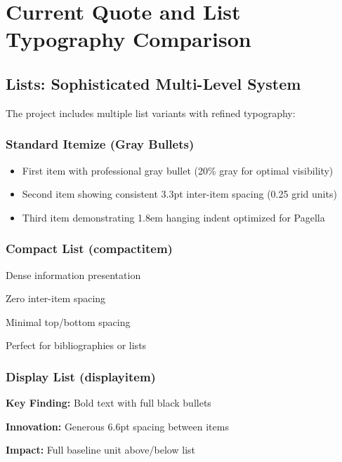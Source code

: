 \documentclass[11pt]{article}
\begin{document}
\section{Current Quote and List Typography Comparison}

\subsection{Lists: Sophisticated Multi-Level System}

The project includes multiple list variants with refined typography:

\subsubsection{Standard Itemize (Gray Bullets)}
\begin{itemize}
\item First item with professional gray bullet (20\% gray for optimal visibility)
\item Second item showing consistent 3.3pt inter-item spacing (0.25 grid units)
\item Third item demonstrating 1.8em hanging indent optimized for Pagella
\end{itemize}

\subsubsection{Compact List (compactitem)}
\begin{compactitem}
\item Dense information presentation
\item Zero inter-item spacing
\item Minimal top/bottom spacing
\item Perfect for bibliographies or lists
\end{compactitem}

\subsubsection{Display List (displayitem)}
\begin{displayitem}
\item \textbf{Key Finding:} Bold text with full black bullets
\item \textbf{Innovation:} Generous 6.6pt spacing between items
\item \textbf{Impact:} Full baseline unit above/below list
\end{displayitem}
\end{document}
